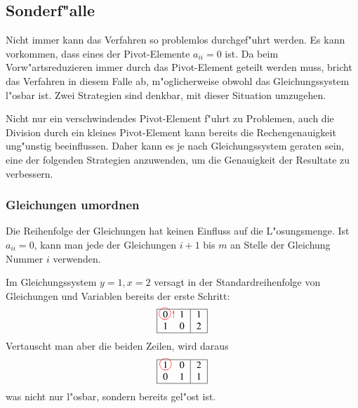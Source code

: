 \subsection{Sonderf"alle}
Nicht immer kann das Verfahren so problemlos durchgef"uhrt werden.
Es kann vorkommen, dass eines der Pivot-Elemente $a_{ii}=0$ ist.
Da beim Vorw"artsreduzieren immer durch das Pivot-Element geteilt
werden muss, bricht das Verfahren in diesem Falle ab, m"oglicherweise
obwohl das Gleichungssystem l"osbar ist. Zwei Strategien
sind denkbar, mit dieser Situation umzugehen.

Nicht nur ein verschwindendes Pivot-Element f"uhrt zu Problemen,
auch die Division durch ein kleines Pivot-Element kann bereits die
Rechengenauigkeit un\-g"unstig beeinflussen. Daher kann es je nach
Gleichungssystem geraten sein, eine der folgenden Strategien anzuwenden,
um die Genauigkeit der Resultate zu verbessern.
\subsubsection{Gleichungen umordnen}
Die Reihenfolge der Gleichungen hat keinen Einfluss auf die L"osungsmenge.
Ist $a_{ii}=0$, kann man jede der Gleichungen $i+1$ bis $m$ an Stelle
der Gleichung Nummer $i$ verwenden.

\begin{beispiel}[\bf Beispiel] Im Gleichungssystem $y=1, x=2$ versagt
in der Standardreihenfolge von Gleichungen und Variablen bereits der
erste Schritt:
\begin{gather*}
\begin{tabular}{|>{$}c<{$}>{$}c<{$}|>{$}c<{$}|}
\hline
0%
\begin{picture}(0,0)
\color{red}\put(-3,4){\circle{12}}
\put(4,0){!}
\end{picture}%
&1&1\\
1&0&2\\
\hline
\end{tabular}
\end{gather*}
Vertauscht man aber die beiden Zeilen, wird daraus
\begin{gather*}
\begin{tabular}{|>{$}c<{$}>{$}c<{$}|>{$}c<{$}|}
\hline
\begin{picture}(0,0)
\color{red}\put(2.7,4){\circle{12}}
\end{picture}%
1&0&2\\
0&1&1\\
\hline
\end{tabular}
\end{gather*}
was nicht nur l"osbar, sondern bereits gel"ost ist.
\end{beispiel}

